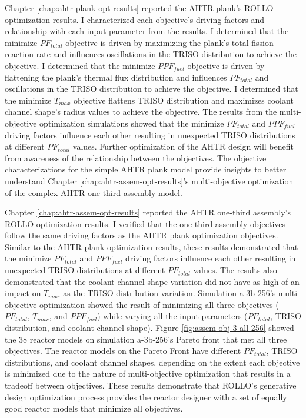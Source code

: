 Chapter \ref{chap:ahtr-plank-opt-results} reported the \gls{AHTR} plank's 
\gls{ROLLO} optimization results.
I characterized each objective's driving factors and relationship 
with each input parameter from the results. 
I determined that the minimize $PF_{total}$ objective is driven by maximizing the plank's 
total fission reaction rate and influences oscillations in the TRISO distribution to 
achieve the objective. 
I determined that the minimize $PPF_{fuel}$ objective is driven by flattening the plank's
thermal flux distribution and influences $PF_{total}$ and oscillations in the TRISO 
distribution to achieve the objective.
I determined that the minimize $T_{max}$ objective flattens TRISO distribution and 
maximizes coolant channel shape's radius values to achieve the objective.
The results from the multi-objective optimization simulations showed that 
the minimize $PF_{total}$ and $PPF_{fuel}$ driving factors influence each other 
resulting in unexpected TRISO distributions at different $PF_{total}$ values. 
Further optimization of the \gls{AHTR} design will benefit from awareness 
of the relationship between the objectives. 
The objective characterizations for the simple \gls{AHTR} plank model provide insights 
to better understand Chapter \ref{chap:ahtr-assem-opt-results}'s multi-objective 
optimization of the complex \gls{AHTR} one-third assembly model.   

Chapter \ref{chap:ahtr-assem-opt-results} reported the \gls{AHTR} one-third assembly's
\gls{ROLLO} optimization results.
I verified that the one-third assembly objectives follow the same driving 
factors as the \gls{AHTR} plank optimization objectives. 
Similar to the \gls{AHTR} plank optimization results, these results demonstrated that 
the minimize $PF_{total}$ and $PPF_{fuel}$ driving factors influence each other 
resulting in unexpected TRISO distributions at different $PF_{total}$ values. 
The results also demonstrated that the coolant channel shape variation did 
not have as high of an impact on $T_{max}$ as the \gls{TRISO} distribution variation.
Simulation a-3b-256's multi-objective optimization showed the result of minimizing all 
three objectives ($PF_{total}$, $T_{max}$, and $PPF_{fuel}$) while varying 
all the input parameters ($PF_{total}$, TRISO distribution, and coolant channel shape).
Figure \ref{fig:assem-obj-3-all-256} showed the 38 reactor models on simulation 
a-3b-256's Pareto front that met all three objectives. 
The reactor models on the Pareto Front have different $PF_{total}$, TRISO distributions, 
and coolant channel shapes, depending on the extent each objective is minimized due 
to the nature of multi-objective optimization that results in a tradeoff between 
objectives. 
These results demonstrate that \gls{ROLLO}'s generative design optimization process 
provides the reactor designer with a set of equally good reactor models that minimize 
all objectives.

